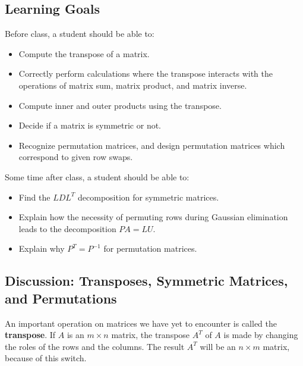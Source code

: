 \documentclass[10pt,]{book}
\newcommand{\terminology}[1]{\textbf{#1}}
\theoremstyle{plain}
\numberwithin{equation}{section}
\begin{document}
\subsection[Learning Goals]{Learning Goals}\label{subsection-52}
Before class, a student should be able to:%
\begin{itemize}
\item{}
        Compute the transpose of a matrix.
      \item{}
        Correctly perform calculations where the transpose interacts with the
        operations of matrix sum, matrix product, and matrix inverse.
      \item{}
        Compute inner and outer products using the transpose.
      \item{}
        Decide if a matrix is symmetric or not.
      \item{}
        Recognize permutation matrices, and design permutation matrices which
        correspond to given row swaps.
      \end{itemize}
\par

      Some time after class, a student should be able to:
\begin{itemize}
\item{}
        Find the \(LDL^T\) decomposition for symmetric matrices.
      \item{}
        Explain how the necessity of permuting rows during Gaussian elimination
        leads to the decomposition \(PA = LU\).
      \item{}
        Explain why \(P^T = P^{-1}\) for permutation matrices.
      \end{itemize}
\typeout{************************************************}
\typeout{************************************************}
\subsection[Discussion: Transposes, Symmetric Matrices, and Permutations]{Discussion: Transposes, Symmetric Matrices, and Permutations}\label{subsection-53}

      An important operation on matrices we have yet to encounter is called the
      \terminology{transpose}. If \(A\) is an \(m\times n\) matrix, the
      transpose \(A^T\) of
      \(A\) is made by changing the roles of the rows and the columns. The result
      \(A^T\) will be an \(n \times m\) matrix, because of this switch.
\par
\end{document}
